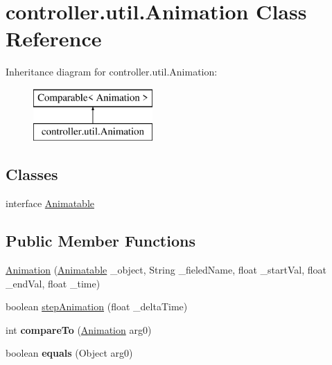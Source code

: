 \hypertarget{classcontroller_1_1util_1_1_animation}{\section{controller.\-util.\-Animation Class Reference}
\label{classcontroller_1_1util_1_1_animation}
}
Inheritance diagram for controller.\-util.\-Animation\-:\begin{figure}[H]
\begin{center}
\leavevmode
\includegraphics[height=2.000000cm]{classcontroller_1_1util_1_1_animation}
\end{center}
\end{figure}
\subsection*{Classes}
\begin{DoxyCompactItemize}
\item 
interface \hyperlink{interfacecontroller_1_1util_1_1_animation_1_1_animatable}{Animatable}
\end{DoxyCompactItemize}
\subsection*{Public Member Functions}
\begin{DoxyCompactItemize}
\item 
\hyperlink{classcontroller_1_1util_1_1_animation_a43abd777d3c714dd526fca7a3ffde346}{Animation} (\hyperlink{interfacecontroller_1_1util_1_1_animation_1_1_animatable}{Animatable} \-\_\-object, String \-\_\-fieled\-Name, float \-\_\-start\-Val, float \-\_\-end\-Val, float \-\_\-time)
\item 
boolean \hyperlink{classcontroller_1_1util_1_1_animation_a4f4b2dfafe34749665dde788be0ca3d4}{step\-Animation} (float \-\_\-delta\-Time)
\item 
\hypertarget{classcontroller_1_1util_1_1_animation_ac628a796ed83e7d5594d61f27f29b5de}{int {\bfseries compare\-To} (\hyperlink{classcontroller_1_1util_1_1_animation}{Animation} arg0)}\label{classcontroller_1_1util_1_1_animation_ac628a796ed83e7d5594d61f27f29b5de}

\item 
\hypertarget{classcontroller_1_1util_1_1_animation_afba5245ec966e222812ebfa7f473688e}{boolean {\bfseries equals} (Object arg0)}\label{classcontroller_1_1util_1_1_animation_afba5245ec966e222812ebfa7f473688e}

\end{DoxyCompactItemize}


